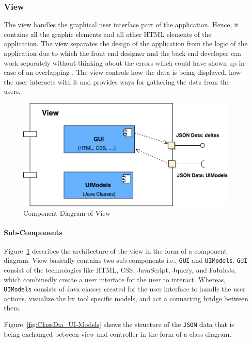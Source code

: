 \subsubsection{View}\label{subsubsec:design_view}
The view handles the graphical user interface part of the application. Hence, it contains all the graphic elements and all other HTML elements of the application. The view separates the design of the application from the logic of the application due to which the front end designer and the back end developer can work separately without thinking about the errors which could have shown up in case of an overlapping \cite{designpattern-headfirst} \cite{mvc-arch}. The view controls how the data is being displayed, how the user interacts with it and provides ways for gathering the data from the users.

\begin{figure}
	\includegraphics[width=1\textwidth]{figures/Component_Diagram-View}
	\caption{Component Diagram of View}
	\label{fig:Component_Diagram-View}
\end{figure}

\paragraph{Sub-Components}
Figure~\ref{fig:Component_Diagram-View} describes the architecture of the view in the form of a component diagram. View basically contains two sub-components i.e., \texttt{GUI} and \texttt{UIModels}. \texttt{GUI} consist of the technologies like HTML, CSS, JavaScript, Jquery, and FabricJs, which combinedly create a user interface for the user to interact. Whereas, \texttt{UIModels} consists of Java classes created for the user interface to handle the user actions, visualize the bx tool specific models, and act a connecting bridge between them. 

Figure~\ref{fig:ClassDia_UI-Models} shows the structure of the \texttt{JSON} data that is being exchanged between view and controller in the form of a class diagram.

